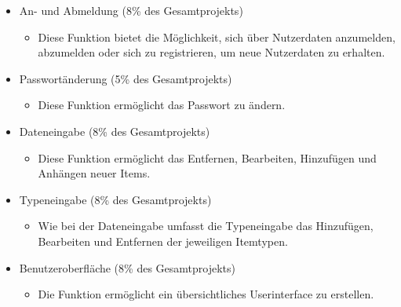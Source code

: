 \documentclass[11pt,a4paper]{report}
\begin{document}
\begin{itemize}
\itemsep1pt\parskip0pt
\item
  An- und Abmeldung (8\% des Gesamtprojekts)

  \begin{itemize}
  \item
    Diese Funktion bietet die Möglichkeit, sich über Nutzerdaten anzumelden, abzumelden
    oder sich zu registrieren, um neue Nutzerdaten zu erhalten.
  \end{itemize}
  
\item
  Passwortänderung (5\% des Gesamtprojekts)

  \begin{itemize}
  \item
    Diese Funktion ermöglicht das Passwort zu ändern.
  \end{itemize}
  
\item
  Dateneingabe (8\% des Gesamtprojekts)

  \begin{itemize}
  \item
    Diese Funktion ermöglicht das Entfernen, Bearbeiten, Hinzufügen und Anhängen neuer
    Items.
  \end{itemize}
  
\item
  Typeneingabe (8\% des Gesamtprojekts)

  \begin{itemize}
  \item
    Wie bei der Dateneingabe umfasst die Typeneingabe das Hinzufügen,
    Bearbeiten und Entfernen der jeweiligen Itemtypen.
  \end{itemize}
  
\item
  Benutzeroberfläche (8\% des Gesamtprojekts)

  \begin{itemize}
  \item
    Die Funktion ermöglicht ein übersichtliches Userinterface zu erstellen.
  \end{itemize}
  
\end{itemize}
\end{document}
